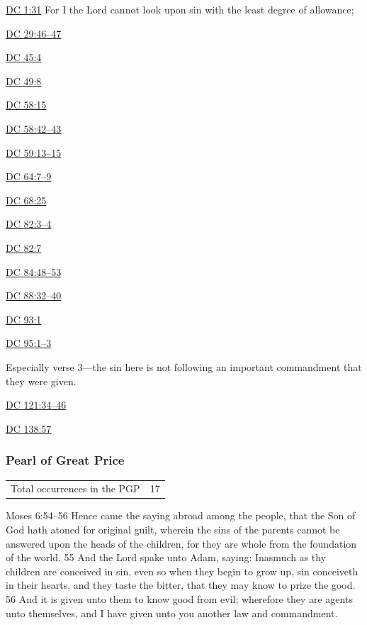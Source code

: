 		\begin{compactdesc}
			\item[{\hyperref[DC1-31]{DC 1:31}}] For I the Lord cannot look upon sin with the least degree of allowance;
			\item[{\hyperref[DC29-46]{DC 29:46--47}}]
			\item[{\hyperref[DC45-4]{DC 45:4}}]
			\item[{\hyperref[DC49-8]{DC 49:8}}] 
			\item[{\hyperref[DC58-15]{DC 58:15}}] 
			\item[{\hyperref[DC58-42]{DC 58:42--43}}] 
			\item[{\hyperref[DC59-13]{DC 59:13--15}}]
			\item[{\hyperref[DC64-7]{DC 64:7--9}}]
			\item[{\hyperref[DC68-25]{DC 68:25}}]
			\item[{\hyperref[DC82-3]{DC 82:3--4}}]
			\item[{\hyperref[DC82-7]{DC 82:7}}]
			\item[{\hyperref[DC84-48]{DC 84:48--53}}] 
			\item[{\hyperref[DC88-32]{DC 88:32--40}}]
			\item[{\hyperref[DC93-1]{DC 93:1}}] 
			\item[{\hyperref[DC95-1]{DC 95:1--3}}]
				\begin{compactitem}
					\item Especially verse 3---the sin here is not following an important commandment that they were given.
				\end{compactitem}
			\item[{\hyperref[DC121-34]{DC 121:34--46}}] 
			\item[{\hyperref[DC138-57]{DC 138:57}}] 
		\end{compactdesc}
		
	\subsubsection{Pearl of Great Price} %
		\label{SIN-PGP}
	
		\begin{tabular}{ll}
			Total occurrences in the PGP & 17 %
		\end{tabular}
		
		\begin{compactdesc}
			\item[Moses 6:54--56] Hence came the saying abroad among the people, that the Son of God hath atoned for original guilt, wherein the sins of the parents cannot be answered upon the heads of the children, for they are whole from the foundation of the world. 55 And the Lord spake unto Adam, saying: Inasmuch as thy children are conceived in sin, even so when they begin to grow up, sin conceiveth in their hearts, and they taste the bitter, that they may know to prize the good. 56 And it is given unto them to know good from evil; wherefore they are agents unto themselves, and I have given unto you another law and commandment. 
		\end{compactdesc}
		
